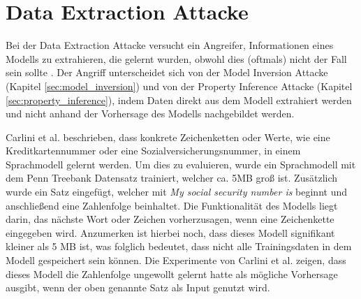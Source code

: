 \section{Data Extraction Attacke}\label{sec:data_ext}

Bei der Data Extraction Attacke versucht ein Angreifer, Informationen eines Modells zu extrahieren, die gelernt wurden, obwohl dies (oftmals) nicht der Fall sein sollte \cite{P-87}.
Der Angriff unterscheidet sich von der Model Inversion Attacke (Kapitel \ref{sec:model_inversion}) und von der Property Inference Attacke (Kapitel \ref{sec:property_inference}), indem Daten direkt aus dem Modell extrahiert werden und nicht anhand der Vorhersage des Modells nachgebildet werden.

Carlini et al. \cite{P-87} beschrieben, dass konkrete Zeichenketten oder Werte, wie eine Kreditkartennummer oder eine Sozialversicherungsnummer, in einem Sprachmodell gelernt werden.
Um dies zu evaluieren, wurde ein Sprachmodell mit dem Penn Treebank Datensatz trainiert, welcher ca. 5MB groß ist. 
Zusätzlich wurde ein Satz eingefügt, welcher mit \textit{\dq My social security number is \dq} beginnt und anschließend eine Zahlenfolge beinhaltet.
Die Funktionalität des Modells liegt darin, das nächste Wort oder Zeichen vorherzusagen, wenn eine Zeichenkette eingegeben wird.
Anzumerken ist hierbei noch, dass dieses Modell signifikant kleiner als 5 MB ist, was folglich bedeutet, dass nicht alle Trainingsdaten in dem Modell gespeichert sein können.
Die Experimente von Carlini et al. \cite{P-87} zeigen, dass dieses Modell die Zahlenfolge ungewollt gelernt hatte als mögliche Vorhersage ausgibt, wenn der oben genannte Satz als Input genutzt wird.


